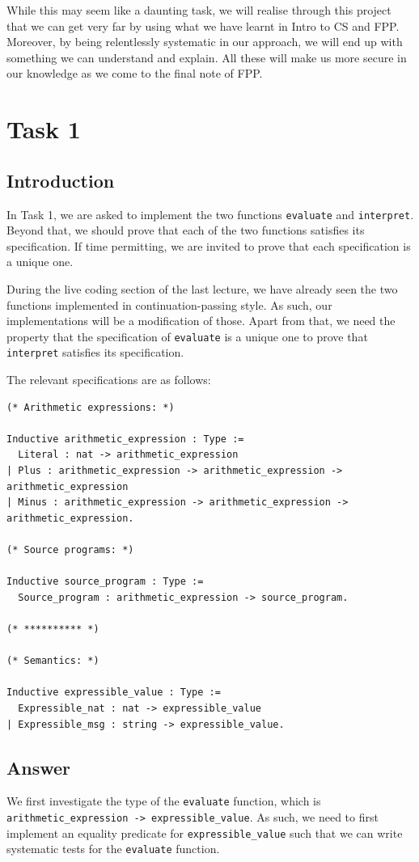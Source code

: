 \documentclass{article}
\begin{document}
While this may seem like a daunting task, we will realise through this project that we can get very far by using what we have learnt in Intro to CS and FPP. Moreover, by being relentlessly systematic in our approach, we will end up with something we can understand and explain. All these will make us more secure in our knowledge as we come to the final note of FPP.

\section{Task 1}

\subsection{Introduction}
In Task 1, we are asked to implement the two functions \texttt{evaluate} and \texttt{interpret}. Beyond that, we should prove that each of the two functions satisfies its specification. If time permitting, we are invited to prove that each specification is a unique one.  

During the live coding section of the last lecture, we have already seen the two functions implemented in continuation-passing style. As such, our implementations will be a modification of those. Apart from that, we need the property that the specification of \texttt{evaluate} is a unique one to prove that \texttt{interpret} satisfies its specification. 

The relevant specifications are as follows:

\begin{lstlisting}
(* Arithmetic expressions: *)

Inductive arithmetic_expression : Type :=
  Literal : nat -> arithmetic_expression
| Plus : arithmetic_expression -> arithmetic_expression -> arithmetic_expression
| Minus : arithmetic_expression -> arithmetic_expression -> arithmetic_expression.

(* Source programs: *)

Inductive source_program : Type :=
  Source_program : arithmetic_expression -> source_program.

(* ********** *)

(* Semantics: *)

Inductive expressible_value : Type :=
  Expressible_nat : nat -> expressible_value
| Expressible_msg : string -> expressible_value.
\end{lstlisting}

\subsection{Answer}
We first investigate the type of the \texttt{evaluate} function, which is \texttt{arithmetic\_expression -> expressible\_value}. As such, we need to first implement an equality predicate for \texttt{expressible\_value} such that we can write systematic tests for the \texttt{evaluate} function.
\end{document}
